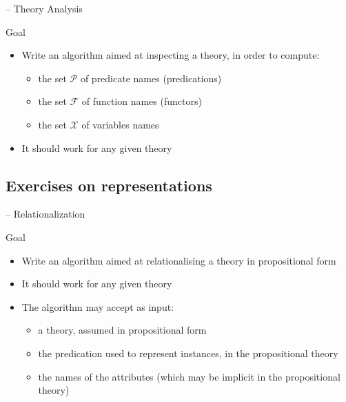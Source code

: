 \documentclass[presentation]{beamer}\mode<presentation>{\usetheme{AMSBolognaFC}}
\begin{document}
\begin{frame}{\currentExercise{} -- Theory Analysis}
    \begin{block}{Goal}
        \begin{itemize}
            \item Write an algorithm aimed at inspecting a theory, in order to compute:
            \begin{itemize}
                \item the set $\mathcal{P}$ of predicate names (predications)
                \item the set $\mathcal{F}$ of function names (functors)
                \item the set $\mathcal{X}$ of variables names 
            \end{itemize}
            \item It should work \alert{for any given theory}
        \end{itemize}
    \end{block}
\end{frame}

\subsection{Exercises on representations}

\startExercise{}

\begin{frame}{\currentExercise{} -- Relationalization}
    \begin{block}{Goal}
        \begin{itemize}
            \item Write an algorithm aimed at relationalising a theory in propositional form
            
            \item It should work \alert{for any given theory}
            
            \item The algorithm may accept as input:
            \begin{itemize}
                \item a theory, assumed in propositional form
                \item the predication used to represent instances, in the propositional theory
                \item the names of the attributes (which may be implicit in the propositional theory)
            \end{itemize}
        \end{itemize}
    \end{block}
\end{frame}
\end{document}
